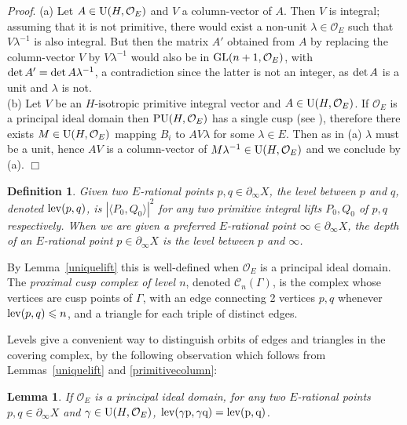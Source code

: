 \documentclass{article}[12pt]
\newtheorem{lem}{Lemma}%
\newtheorem{dfn}{Definition}%
\newcommand{\Pf}{{\em Proof}. }
\newcommand{\EPf}{\hfill$\Box$\vspace{.5cm}}
\begin{document}
\Pf (a) Let $A \in {\rm U}(H,\mathcal{O}_E)$ and $V$ a column-vector of $A$. Then $V$ is integral; assuming that it is not primitive, there would exist a non-unit $\lambda \in \mathcal{O}_E$ such that $V\lambda^{-1}$ is also integral. But then the matrix $A'$ obtained from $A$ by replacing the column-vector $V$ by $V\lambda^{-1}$ would also be in ${\rm GL}(n+1,\mathcal{O}_E)$, with ${\rm det}\, A'={\rm det}\, A\lambda^{-1}$, a contradiction since the latter is not an integer, as ${\rm det}\, A$ is a unit and $\lambda$ is not. \\
(b) Let $V$ be an $H$-isotropic primitive integral vector and $A \in {\rm U}(H,\mathcal{O}_E)$. If $\mathcal{O}_E$ is a principal ideal domain then ${\rm PU}(H,\mathcal{O}_E)$ has a single cusp (see \cite{Zi}), therefore there exists $M \in {\rm U}(H,\mathcal{O}_E)$ mapping $B_i$ to $AV\lambda$ for some $\lambda \in E$. Then as in (a) $\lambda$ must be a unit, hence $AV$ is a column-vector of $M\lambda^{-1} \in {\rm U}(H,\mathcal{O}_E)$ and we conclude by (a). \EPf


\begin{dfn}\label{level} Given two $E$-rational points $p,q \in \partial_\infty X$, the \emph{level between $p$ and $q$}, denoted ${\rm lev}(p,q)$, is $| \langle P_0, Q_0 \rangle |^2$ for any two primitive integral lifts $P_0,Q_0$ of $p,q$ respectively. When we are given a preferred $E$-rational point $\infty \in \partial_\infty X$, the \emph{depth} of an $E$-rational point $p \in \partial_\infty X$ is the level between $p$ and $\infty$.
\end{dfn}

By Lemma~\ref{uniquelift} this is well-defined when $\mathcal{O}_E$ is a principal ideal domain. 
The \emph{proximal cusp complex of level $n$}, denoted $\mathcal{C}_n(\Gamma)$, is the complex whose vertices are cusp points of $\Gamma$, with an edge connecting 2 vertices $p,q$ whenever ${\rm lev}(p,q) \leqslant n$, and a triangle for each triple of distinct edges.

Levels give a convenient way to distinguish orbits of edges and triangles in the covering complex, by the following observation which follows from Lemmas~\ref{uniquelift} and \ref{primitivecolumn}:

\begin{lem} If $\mathcal{O}_E$ is a principal ideal domain, for any two $E$-rational points $p,q \in \partial_\infty X$ and $\gamma \in {\rm U}(H,\mathcal{O}_E)$, $\rm{lev}(\gamma p, \gamma q)={\rm lev}(p,q)$.
\end{lem}
\end{document}
